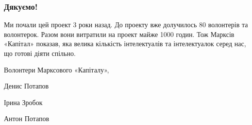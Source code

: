 \documentclass{kapital}
\begin{document}
\subsubsection*{Дякуємо!}

Ми почали цей проект 3 роки назад. До проекту вже долучилось 80 волонтерів та волонтерок. Разом вони витратили на проект майже 1000 годин. Тож Марксів «Капітал» показав, яка велика кількість інтелектуалів та інтелектуалок серед нас, що готові діяти спільно. 

\bigskip{}

\noindent{}Волонтери Марксового «Капіталу»,

\medskip{}

\noindent{}Денис Потапов

\noindent{}Ірина Зробок

\noindent{}Антон Потапов
\end{document}
